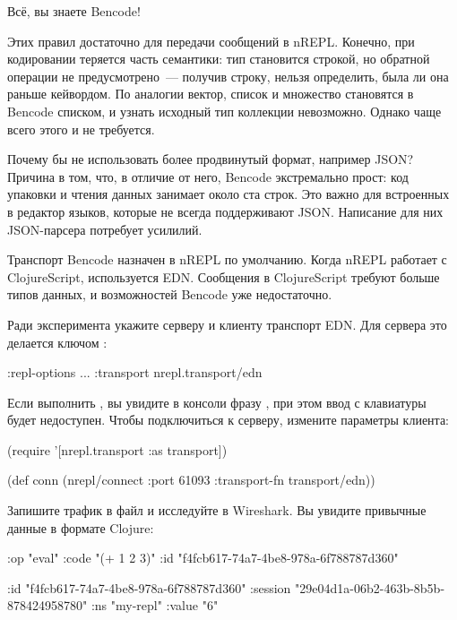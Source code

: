Всё, вы знаете Bencode!

Этих правил достаточно для передачи сообщений в nREPL. Конечно, при кодировании теряется часть семантики: тип  становится строкой, но обратной операции не предусмотрено~--- получив строку, нельзя определить, была ли она раньше кейвордом. По аналогии вектор, список и множество становятся в Bencode списком, и узнать исходный тип коллекции невозможно. Однако чаще всего этого и не требуется.

Почему бы не использовать более продвинутый формат, например JSON? Причина в том, что, в отличие от него, Bencode экстремально прост: код упаковки и чтения данных занимает около ста строк. Это важно для встроенных в редактор языков, которые не всегда поддерживают JSON. Написание для них JSON-парсера потребует усилилий.

Транспорт Bencode назначен в nREPL по умолчанию. Когда nREPL работает с ClojureScript, используется EDN. Сообщения в ClojureScript требуют больше типов данных, и возможностей Bencode уже недостаточно.

Ради эксперимента укажите серверу и клиенту транспорт EDN. Для сервера это делается ключом :

\begin{english}
  \begin{clojure}
:repl-options {...
               :transport nrepl.transport/edn}
  \end{clojure}
\end{english}

Если выполнить , вы увидите в консоли фразу , при этом ввод с клавиатуры будет недоступен. Чтобы подключиться к серверу, измените параметры клиента:

\begin{english}
  \begin{clojure}
(require '[nrepl.transport :as transport])

(def conn (nrepl/connect
           :port 61093
           :transport-fn transport/edn))
  \end{clojure}
\end{english}

Запишите трафик в файл и исследуйте в Wireshark. Вы увидите привычные данные в формате Clojure:

\begin{english}
  \begin{clojure}
{:op "eval"
 :code "(+ 1 2 3)"
 :id "f4fcb617-74a7-4be8-978a-6f788787d360"}

{:id "f4fcb617-74a7-4be8-978a-6f788787d360"
 :session "29e04d1a-06b2-463b-8b5b-878424958780"
 :ns "my-repl"
 :value "6"}
  \end{clojure}
\end{english}

